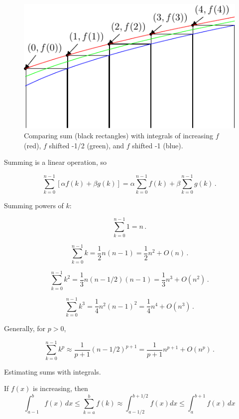 \documentclass{tufte-handout}
\theoremstyle{definition}
\theoremstyle{example}
\theoremstyle{theorem}
\begin{document}
\begin{figure}
\begin{center}
\includegraphics[width=1.00\linewidth]{graphics/intmid.pdf}
\end{center}
\caption{\label{fig:intmid}Comparing sum (black rectangles) with integrals of increasing $f$ (red), $f$ shifted -1/2 (green), and $f$ shifted -1 (blue).}
\label{fig:intmid}
\end{figure}

Summing is a linear operation, so

\begin{equation}
  \sum_{k=0}^{n-1} \left[ \alpha f(k) + \beta g(k) \right] = \alpha \sum_{k=0}^{n-1} f(k) + \beta \sum_{k=0}^{n-1} g(k) \,.
\end{equation}

Summing powers of $k$:

\begin{equation}
  \sum_{k=0}^{n-1} 1 = n \,.
\end{equation}

\begin{equation}
  \sum_{k=0}^{n-1} k = \frac{1}{2} n(n-1) = \frac{1}{2} n^2 + O(n)\,.
\end{equation}

\begin{equation}
  \sum_{k=0}^{n-1} k^2 = \frac{1}{3}n(n-1/2)(n-1) = \frac{1}{3} n^3 + O(n^2) \,.
\end{equation}

\begin{equation}
  \sum_{k=0}^{n-1} k^3 = \frac{1}{4}n^2(n-1)^2 = \frac{1}{4} n^4 + O(n^3) \,.
\end{equation}

Generally, for $p>0$,

\begin{equation}
  \sum_{k=0}^{n-1} k^p \approx \frac{1}{p+1} (n-1/2)^{p+1} = \frac{1}{p+1} n^{p+1} +O(n^p) \,.
\end{equation}

Estimating sums with integrals.

If $f(x)$ is increasing, then
\begin{equation}
\int_{a-1}^{b} f(x) \, dx \leq \sum_{k=a}^{b} f(k) \approx \int_{a-1/2}^{b+1/2} f(x) dx \leq \int_{a}^{b+1} f(x) \, dx
\end{equation}
\end{document}
